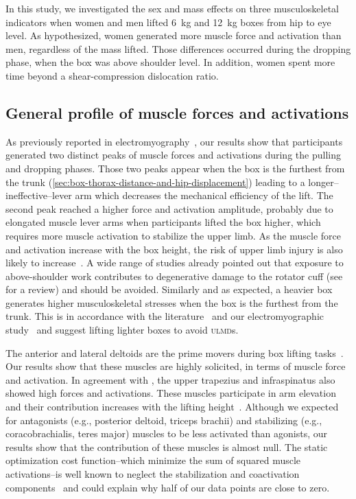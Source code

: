 In this study, we investigated the sex and mass effects on three musculoskeletal indicators when women and men lifted 6~kg and 12~kg boxes from hip to eye level.
As hypothesized, women generated more muscle force and activation than men, regardless of the mass lifted.
Those differences occurred during the dropping phase, when the box was above shoulder level.
In addition, women spent more time beyond a shear-compression dislocation ratio.

\subsection{General profile of muscle forces and activations}\label{subsec:general-profile-of-muscle-forces-and-activations}

As previously reported in electromyography~\cite{Bouffard2019-fd}, our results show that participants generated two distinct peaks of muscle forces and activations during the pulling and dropping phases.
Those two peaks appear when the box is the furthest from the trunk (\ref{sec:box-thorax-distance-and-hip-displacement}) leading to a longer--ineffective--lever arm which decreases the mechanical efficiency of the lift.
The second peak reached a higher force and activation amplitude, probably due to elongated muscle lever arms when participants lifted the box higher, which requires more muscle activation to stabilize the upper limb.
As the muscle force and activation increase with the box height, the risk of upper limb injury is also likely to increase~\cite{Blache2015-oc}.
A wide range of studies already pointed out that exposure to above-shoulder work contributes to degenerative damage to the rotator cuff (see \citet{Van_der_Molen2017-sb} for a review) and should be avoided.
Similarly and as expected, a heavier box generates higher musculoskeletal stresses when the box is the furthest from the trunk.
This is in accordance with the literature~\cite{Blache2015-xe, Yoon2012-ap} and our electromyographic study~\cite{Bouffard2019-fd} and suggest lifting lighter boxes to avoid \textsc{ulmd}s.

The anterior and lateral deltoids are the prime movers during box lifting tasks~\cite{Blache2017-pv,Blache2015-oc,Bouffard2019-fd}.
Our results show that these muscles are highly solicited, in terms of muscle force and activation.
In agreement with \citet{Blache2015-oc}, the upper trapezius and infraspinatus also showed high forces and activations.
These muscles participate in arm elevation~\cite{Ackland2008-vt, Escamilla2009-ho} and their contribution increases with the lifting height~\cite{Blache2015-oc, Herberts1984-xk}.
Although we expected for antagonists (e.g., posterior deltoid, triceps brachii) and stabilizing (e.g., coracobrachialis, teres major) muscles to be less activated than agonists, our results show that the contribution of these muscles is almost null.
The static optimization cost function--which minimize the sum of squared muscle activations--is well known to neglect the stabilization and coactivation components~\cite{Gottlieb2000-ga, Kian2019-gz} and could explain why half of our data points are close to zero.

